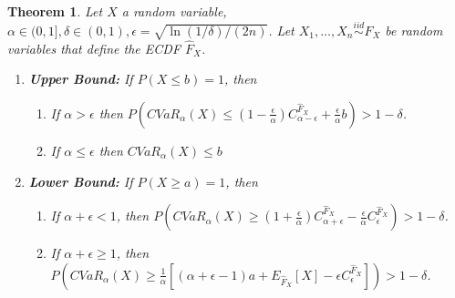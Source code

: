 \documentclass[letterpaper]{article} %
\newtheorem{theorem}{Theorem}[section]
\begin{document}
\begin{theorem}
	\label{thm:ecdf_cvar_bound}
	Let $X$ a random variable, $\alpha\in (0, 1],\delta \in (0, 1), \epsilon=\sqrt{\ln(1/\delta)/(2n)}$. Let $X_1, \dots, X_n \overset{iid}{\sim} F_X$ be random variables that define the ECDF $\hat{F}_X$. 
	\begin{enumerate}
		\item \textbf{Upper Bound:} If $P(X\leq b)=1$, then 
		\begin{enumerate}
			\item If $\alpha > \epsilon$ then $P(CVaR_\alpha(X) \leq (1-\frac{\epsilon}{\alpha})C_{\alpha-\epsilon}^{\hat{F}_X} + \frac{\epsilon}{\alpha}b)> 1-\delta$.
			
			\item If $\alpha\leq \epsilon$ then $CVaR_\alpha(X)\leq b$
		\end{enumerate}
		
		\item \textbf{Lower Bound:} If $P(X\geq a)=1$, then 
		\begin{enumerate}
			\item If $\alpha+\epsilon < 1$, then $P(CVaR_\alpha(X)\geq (1+\frac{\epsilon}{\alpha})C_{\alpha+\epsilon}^{\hat{F}_X}-\frac{\epsilon}{\alpha}C_{\epsilon}^{\hat{F}_X})> 1-\delta$.
			
			\item If $\alpha+\epsilon \geq 1$, then $P(CVaR_\alpha(X) \geq \frac{1}{\alpha}[(\alpha+\epsilon - 1)a + E_{\hat{F}_X}[X] - \epsilon C_\epsilon^{\hat{F}_X}]) > 1-\delta$.
		\end{enumerate}
	\end{enumerate}
\end{theorem}
\end{document}
